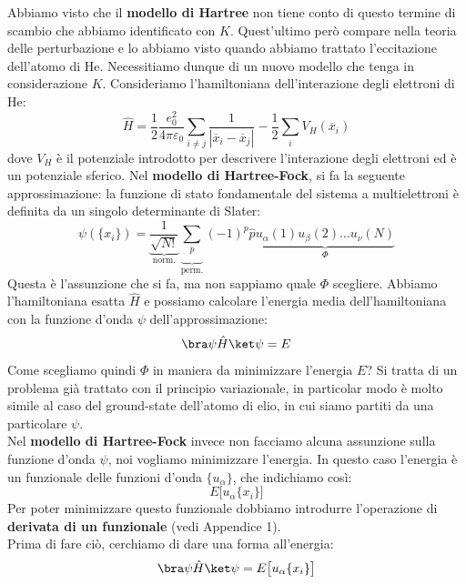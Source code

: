 Abbiamo visto che il \textbf{modello di Hartree} non tiene conto di questo termine di scambio che abbiamo identificato con $K$. Quest'ultimo però compare nella teoria delle perturbazione e lo abbiamo visto quando abbiamo trattato l'eccitazione dell'atomo di He. Necessitiamo dunque di un nuovo modello che tenga in considerazione $K$. Consideriamo l'hamiltoniana dell'interazione degli elettroni di He:
\begin{equation*}
    \hat H = \frac12\frac{e_0^2}{4\pi\varepsilon_0}\sum_{i\neq j}\frac{1}{|\overline{x}_i-\overline{x}_j|}-\frac 12\sum_{i}V_H(\overline{x}_i)
\end{equation*}
\noindent dove $V_H$ è il potenziale introdotto per descrivere l'interazione degli elettroni ed è un potenziale sferico.
Nel \textbf{modello di Hartree-Fock}, si fa la seguente approssimazione: la funzione di stato fondamentale del sistema a multielettroni è definita da un singolo determinante di Slater:
\begin{equation*}
    \psi(\{x_i\})=\underbrace{\frac{1}{\sqrt{N!}}}_{\text{norm.}}\underbrace{\sum_{p}}_{\text{perm.}}(-1)^p\hat p \underbrace{u_\alpha(1)u_\beta(2)\dots u_\nu(N)}_{\Phi}
\end{equation*}
\noindent Questa è l'assunzione che si fa, ma non sappiamo quale $\Phi$ scegliere. Abbiamo l'hamiltoniana esatta $\hat H$ e possiamo calcolare l'energia media dell'hamiltoniana con la funzione d'onda $\psi$ dell'approssimazione:
\begin{equation*}
    \bra\psi \hat H\ket\psi=E
\end{equation*}
Come scegliamo quindi $\Phi$ in maniera da minimizzare l'energia $E$? Si tratta di un problema già trattato con il principio variazionale, in particolar modo è molto simile al caso del ground-state dell'atomo di elio, in cui siamo partiti da una particolare $\psi$.\\
Nel \textbf{modello di Hartree-Fock} invece non facciamo alcuna assunzione sulla funzione d'onda $\psi$, noi vogliamo minimizzare l'energia. In questo caso l'energia è un funzionale delle funzioni d'onda $\{u_\alpha\}$, che indichiamo così:
\begin{equation*}
    E\big[u_\alpha\{x_i\}\big]
\end{equation*}
Per poter minimizzare questo funzionale dobbiamo introdurre l'operazione di \textbf{derivata di un funzionale} (vedi Appendice 1).\\
Prima di fare ciò, cerchiamo di dare una forma all'energia:
\begin{equation*}
    \bra\psi \hat H\ket\psi=E\big[u_\alpha\{x_i\}\big]
\end{equation*}
